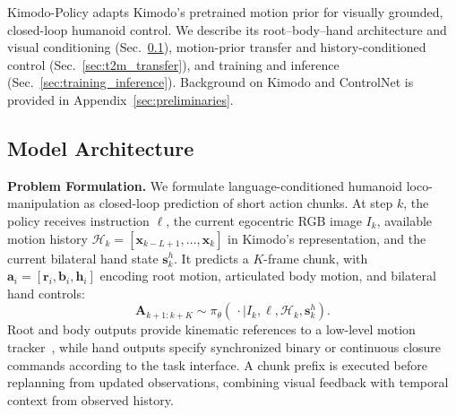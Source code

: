 Kimodo-Policy adapts Kimodo's pretrained motion prior for visually grounded, closed-loop humanoid control. We describe its root--body--hand architecture and visual conditioning (Sec.~\ref{sec:method_architecture}), motion-prior transfer and history-conditioned control (Sec.~\ref{sec:t2m_transfer}), and training and inference (Sec.~\ref{sec:training_inference}). Background on Kimodo and ControlNet is provided in Appendix~\ref{sec:preliminaries}.



\subsection{Model Architecture}
\label{sec:method_architecture}

\textbf{Problem Formulation.} We formulate language-conditioned humanoid loco-manipulation as closed-loop prediction of short action chunks. At step $k$, the policy receives instruction $\ell$, the current egocentric RGB image $I_k$, available motion history $\mathcal{H}_k=[\mathbf{x}_{k-L+1},\ldots,\mathbf{x}_k]$ in Kimodo's representation, and the current bilateral hand state $\mathbf{s}^{h}_k$. It predicts a $K$-frame chunk, with $\mathbf{a}_i=[\mathbf{r}_i,\mathbf{b}_i,\mathbf{h}_i]$ encoding root motion, articulated body motion, and bilateral hand controls:
\begin{equation}
  \mathbf{A}_{k+1:k+K}\sim\pi_{\theta}(\,\cdot\mid I_k,\ell,\mathcal{H}_k,\mathbf{s}^{h}_k).
  \label{eq:policy_formulation}
\end{equation}
Root and body outputs provide kinematic references to a low-level motion tracker~\cite{ze2025twist2scalableportableholistic,guan2026limmtmotiontracking}, while hand outputs specify synchronized binary or continuous closure commands according to the task interface. A chunk prefix is executed before replanning from updated observations, combining visual feedback with temporal context from observed history.




